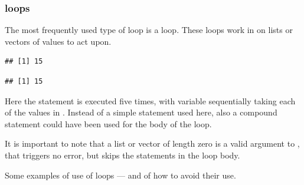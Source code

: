 \documentclass[krantz2]{krantz}\usepackage{knitr}%
\begin{document}
\subsubsection[\texttt{for} loops]{ loops}
The most frequently used type of loop is a  loop. These loops work in \Rlang on lists or vectors of values to act upon.

\begin{knitrout}\footnotesize
{}\color{fgcolor}\begin{kframe}
\begin{alltt}
 \hlkwb{<-} 
   \hlopt{:} \hlkwb{<-}  \hlopt{+} 
\end{alltt}
\begin{verbatim}
## [1] 15
\end{verbatim}
\begin{alltt}
 \hlkwb{<-} \hlstd{(}\hlopt{:}\hlstd{)} 
\end{alltt}
\begin{verbatim}
## [1] 15
\end{verbatim}
\end{kframe}
\end{knitrout}

Here the statement  is executed five times, with variable  sequentially taking each of the values in . Instead of a simple statement used here, also a compound statement could have been used for the body of the  loop.

\begin{warningbox}
It is important to note that a list or vector of length zero is a valid argument to , that triggers no error, but skips the statements in the loop body.
\end{warningbox}

Some examples of use of  loops --- and of how to avoid their use.
\end{document}
